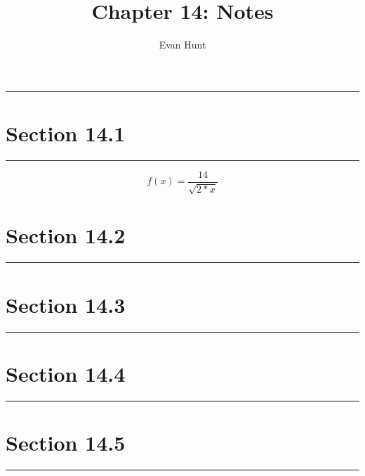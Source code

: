 \documentclass[12pt]{article}
\title{Chapter 14: Notes}
\author{Evan Hunt}
\begin{document}
    \maketitle

    \noindent\rule{\textwidth}{0.4pt}
    \section[]{Section 14.1}
    \noindent\rule{\textwidth}{0.4pt}
        \begin{equation}
            f(x) = \frac{14}{\sqrt{2*x}}
        \end{equation}
    \section[]{Section 14.2}
    \noindent\rule{\textwidth}{0.4pt}
    \section[]{Section 14.3}
    \noindent\rule{\textwidth}{0.4pt}
    \section[]{Section 14.4}
    \noindent\rule{\textwidth}{0.4pt}
    \section[]{Section 14.5}
    \noindent\rule{\textwidth}{0.4pt}
\end{document}
